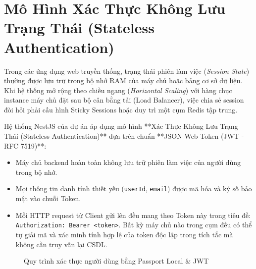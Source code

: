\documentclass[12pt,a4paper,oneside]{book}
\begin{document}
\section{Mô Hình Xác Thực Không Lưu Trạng Thái (Stateless Authentication)}
Trong các ứng dụng web truyền thống, trạng thái phiên làm việc (\textit{Session State}) thường được lưu trữ trong bộ nhớ RAM của máy chủ hoặc bảng cơ sở dữ liệu. Khi hệ thống mở rộng theo chiều ngang (\textit{Horizontal Scaling}) với hàng chục instance máy chủ đặt sau bộ cân bằng tải (Load Balancer), việc chia sẻ session đòi hỏi phải cấu hình Sticky Sessions hoặc duy trì một cụm Redis tập trung.

Hệ thống NestJS của dự án áp dụng mô hình **Xác Thực Không Lưu Trạng Thái (Stateless Authentication)** dựa trên chuẩn **JSON Web Token (JWT - RFC 7519)**:
\begin{itemize}
  \item Máy chủ backend hoàn toàn không lưu trữ phiên làm việc của người dùng trong bộ nhớ.
  \item Mọi thông tin danh tính thiết yếu (\texttt{userId}, \texttt{email}) được mã hóa và ký số bảo mật vào chuỗi Token.
  \item Mỗi HTTP request từ Client gửi lên đều mang theo Token này trong tiêu đề: \texttt{Authorization: Bearer <token>}. Bất kỳ máy chủ nào trong cụm đều có thể tự giải mã và xác minh tính hợp lệ của token độc lập trong tích tắc mà không cần truy vấn lại CSDL.
\end{itemize}

\begin{figure}[htbp]
  \centering
  \caption{Quy trình xác thực người dùng bằng Passport Local \& JWT}
  \label{fig:auth-flow-jwt}
\end{figure}
\end{document}
